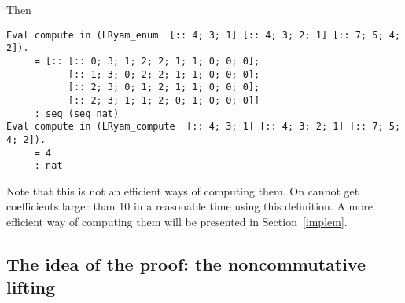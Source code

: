 \documentclass[12pt]{article}
\begin{document}
Then
\begin{lstlisting}
Eval compute in (LRyam_enum  [:: 4; 3; 1] [:: 4; 3; 2; 1] [:: 7; 5; 4; 2]).
     = [:: [:: 0; 3; 1; 2; 2; 1; 1; 0; 0; 0];
           [:: 1; 3; 0; 2; 2; 1; 1; 0; 0; 0];
           [:: 2; 3; 0; 1; 2; 1; 1; 0; 0; 0];
           [:: 2; 3; 1; 1; 2; 0; 1; 0; 0; 0]]
     : seq (seq nat)
Eval compute in (LRyam_compute  [:: 4; 3; 1] [:: 4; 3; 2; 1] [:: 7; 5; 4; 2]).
     = 4
     : nat
\end{lstlisting}
Note that this is not an efficient ways of computing them. On cannot get
coefficients larger than 10 in a reasonable time using this definition. A more
efficient way of computing them will be presented in Section~\ref{implem}.

\subsection{The idea of the proof: the noncommutative lifting}
\end{document}
